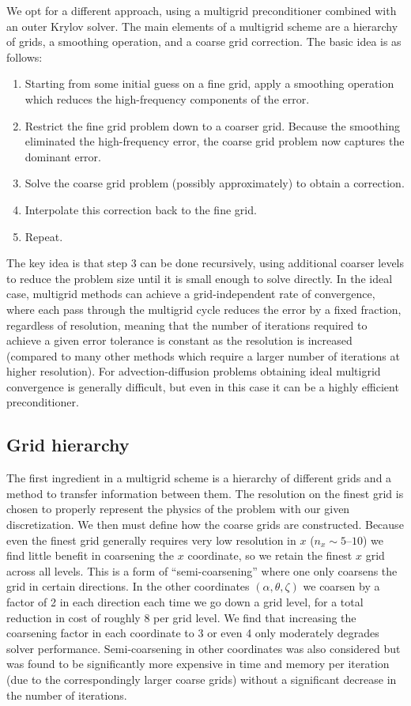 \documentclass[11pt]{article}
\begin{document}
We opt for a different approach, using a multigrid preconditioner combined with
an outer Krylov solver. The main elements of a multigrid scheme are a hierarchy
of grids, a smoothing operation, and a coarse grid correction. The basic idea is
as follows:
\begin{enumerate}
\item Starting from some initial guess on a fine grid, apply a smoothing
operation which reduces the high-frequency components of the error.
\item Restrict the fine grid problem down to a coarser grid. Because the
smoothing eliminated the high-frequency error, the coarse grid problem now
captures the dominant error.
\item Solve the coarse grid problem (possibly approximately) to obtain a
correction.
\item Interpolate this correction back to the fine grid.
\item Repeat.
\end{enumerate}

The key idea is that step 3 can be done recursively, using additional coarser
levels to reduce the problem size until it is small enough to solve directly. In
the ideal case, multigrid methods can achieve a grid-independent rate of
convergence, where each pass through the multigrid cycle reduces the error by a
fixed fraction, regardless of resolution, meaning that the number of iterations
required to achieve a given error tolerance is constant as the resolution is
increased (compared to many other methods which require a larger number of
iterations at higher resolution). For advection-diffusion problems obtaining
ideal multigrid convergence is generally difficult, but even in this case it can
be a highly efficient preconditioner.

\subsection{Grid hierarchy}
\label{sec:grid-hierarchy}

The first ingredient in a multigrid scheme is a hierarchy of different grids and
a method to transfer information between them. The resolution on the finest grid
is chosen to properly represent the physics of the problem with our given
discretization. We then must define how the coarse grids are constructed.
Because even the finest grid generally requires very low resolution in $x$
($n_x \sim 5$--$10$) we find little benefit in coarsening the $x$ coordinate, so
we retain the finest $x$ grid across all levels. This is a form of
``semi-coarsening'' where one only coarsens the grid in certain directions. In
the other coordinates $(\alpha, \theta, \zeta)$ we coarsen by a factor of 2 in
each direction each time we go down a grid level, for a total reduction in cost
of roughly 8 per grid level. We find that increasing the coarsening factor in
each coordinate to 3 or even 4 only moderately degrades solver performance.
Semi-coarsening in other coordinates was also considered but was found to be
significantly more expensive in time and memory per iteration (due to the
correspondingly larger coarse grids) without a significant decrease in the
number of iterations.
\end{document}
